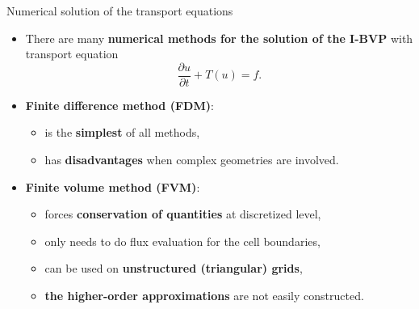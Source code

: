 \begin{frame}{Numerical solution of the transport equations}
\begin{itemize}
\item There are many {\bf numerical methods for the solution of the I-BVP} with transport equation \\[-15pt]
%
\[
\frac{\partial u}{\partial t}+T(u) = f.
\]
%
\vskip -15pt
\pause
\item \alert{\bf Finite difference method (FDM)}:
\begin{itemize}
	\item is the {\bf simplest} of all methods, 
	\item has {\bf disadvantages} when \alert{complex geometries} are involved.
\end{itemize}
%
\pause
\item \alert{\bf Finite volume method (FVM)}:
\begin{itemize}
	\item forces {\bf conservation of quantities} at discretized level, 
	\item only needs to do flux evaluation for the cell boundaries,
	\item can be used on {\bf unstructured (triangular) grids}, 
	\item {\bf the higher-order approximations} are not easily constructed.
\end{itemize}

\end{itemize}
\end{frame}
